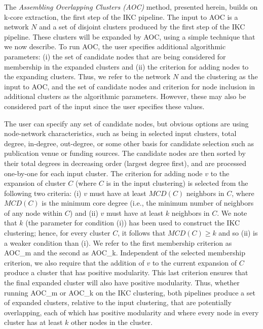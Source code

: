 \documentclass[12pt, oneside]{article}   	%
\begin{document}
	
The \emph{Assembling Overlapping Clusters (AOC)} method, presented herein, builds on k-core extraction, the first step of the IKC pipeline. The input to AOC is a network $N$ and a set of disjoint clusters produced by the first step of the IKC pipeline. These clusters will be expanded by AOC,  using a simple technique that we now describe. To run AOC, the user specifies additional algorithmic parameters:  (i) the set of candidate nodes that are being considered for membership in the expanded clusters and  (ii) the criterion for adding nodes to the expanding clusters. 
Thus, we refer to the network $N$ and the clustering as the input to AOC, and the set of candidate nodes and criterion for node inclusion in additional clusters as the algorithmic parameters. However, these may also be considered part of the input since the user specifies these values.

The user can specify any  set of candidate nodes, but obvious options are using node-network characteristics, such as  being in selected  input clusters,  total degree, in-degree,  out-degree,  or some other basis for candidate selection such as publication venue or funding sources. The candidate nodes are then sorted by their total degrees in decreasing order (largest degree first), and are processed one-by-one for each input cluster. The criterion for adding node $v$ to the expansion of cluster $C$ (where $C$ is in the input clustering) is selected from the following two criteria:
 (i) $v$ must have at least $MCD(C)$ neighbors in  $C$, 
where $MCD(C)$ is the minimum core degree (i.e., the minimum number of neighbors of any node within $C$)  and
(ii) $v$ must have at least $k$ neighbors in  $C$. We note that $k$ (the parameter for condition (i)) has been used to construct the IKC clustering; hence, for every cluster $C$,  it follows that $MCD(C) \geq k$ and so (ii) is a weaker condition than (i). We refer to the first membership criterion as AOC\_m and the second as AOC\_k.
Independent of the selected membership criterion, we also require that the addition of $v$ to the current expansion of $C$ produce a cluster that has positive modularity.
This last criterion ensures that the final expanded cluster will also have positive modularity.
	Thus, whether running   AOC\_m or AOC\_k on the IKC clustering, both pipelines produce a set of expanded clusters, relative to the input clustering, that are potentially overlapping,  each of which has positive modularity and where every node in every cluster has at least $k$
	 other nodes in the cluster.  
	 	
\end{document}
